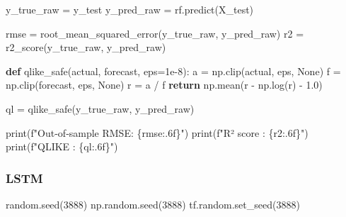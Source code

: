 \documentclass[
  letterpaper,
  DIV=11,
  numbers=noendperiod]{scrartcl}
\newenvironment{Shaded}{\begin{snugshade}}{\end{snugshade}}
\newcommand{\BuiltInTok}[1]{\textcolor[rgb]{0.00,0.23,0.31}{#1}}
\newcommand{\ControlFlowTok}[1]{\textcolor[rgb]{0.00,0.23,0.31}{\textbf{#1}}}
\newcommand{\DecValTok}[1]{\textcolor[rgb]{0.68,0.00,0.00}{#1}}
\newcommand{\FloatTok}[1]{\textcolor[rgb]{0.68,0.00,0.00}{#1}}
\newcommand{\KeywordTok}[1]{\textcolor[rgb]{0.00,0.23,0.31}{\textbf{#1}}}
\newcommand{\NormalTok}[1]{\textcolor[rgb]{0.00,0.23,0.31}{#1}}
\newcommand{\OperatorTok}[1]{\textcolor[rgb]{0.37,0.37,0.37}{#1}}
\newcommand{\SpecialCharTok}[1]{\textcolor[rgb]{0.37,0.37,0.37}{#1}}
\newcommand{\SpecialStringTok}[1]{\textcolor[rgb]{0.13,0.47,0.30}{#1}}
\newcommand{\VariableTok}[1]{\textcolor[rgb]{0.07,0.07,0.07}{#1}}
\begin{document}
\begin{Shaded}
\begin{Highlighting}[]
\NormalTok{y\_true\_raw }\OperatorTok{=}\NormalTok{ y\_test                  }
\NormalTok{y\_pred\_raw }\OperatorTok{=}\NormalTok{ rf.predict(X\_test)     }

\NormalTok{rmse }\OperatorTok{=}\NormalTok{ root\_mean\_squared\_error(y\_true\_raw, y\_pred\_raw)}
\NormalTok{r2 }\OperatorTok{=}\NormalTok{ r2\_score(y\_true\_raw, y\_pred\_raw)}

\KeywordTok{def}\NormalTok{ qlike\_safe(actual, forecast, eps}\OperatorTok{=}\FloatTok{1e{-}8}\NormalTok{):}
\NormalTok{    a }\OperatorTok{=}\NormalTok{ np.clip(actual, eps, }\VariableTok{None}\NormalTok{)}
\NormalTok{    f }\OperatorTok{=}\NormalTok{ np.clip(forecast, eps, }\VariableTok{None}\NormalTok{)}
\NormalTok{    r }\OperatorTok{=}\NormalTok{ a }\OperatorTok{/}\NormalTok{ f}
    \ControlFlowTok{return}\NormalTok{ np.mean(r }\OperatorTok{{-}}\NormalTok{ np.log(r) }\OperatorTok{{-}} \FloatTok{1.0}\NormalTok{)}

\NormalTok{ql }\OperatorTok{=}\NormalTok{ qlike\_safe(y\_true\_raw, y\_pred\_raw)}

\BuiltInTok{print}\NormalTok{(}\SpecialStringTok{f"Out‑of‑sample RMSE: }\SpecialCharTok{\{}\NormalTok{rmse}\SpecialCharTok{:.6f\}}\SpecialStringTok{"}\NormalTok{)}
\BuiltInTok{print}\NormalTok{(}\SpecialStringTok{f"R² score         : }\SpecialCharTok{\{}\NormalTok{r2}\SpecialCharTok{:.6f\}}\SpecialStringTok{"}\NormalTok{)}
\BuiltInTok{print}\NormalTok{(}\SpecialStringTok{f"QLIKE            : }\SpecialCharTok{\{}\NormalTok{ql}\SpecialCharTok{:.6f\}}\SpecialStringTok{"}\NormalTok{)}
\end{Highlighting}
\end{Shaded}

\subsubsection{LSTM}\label{lstm-1}

\begin{Shaded}
\begin{Highlighting}[]
\NormalTok{random.seed(}\DecValTok{3888}\NormalTok{)}
\NormalTok{np.random.seed(}\DecValTok{3888}\NormalTok{)}
\NormalTok{tf.random.set\_seed(}\DecValTok{3888}\NormalTok{)}
\end{Highlighting}
\end{Shaded}
\end{document}
